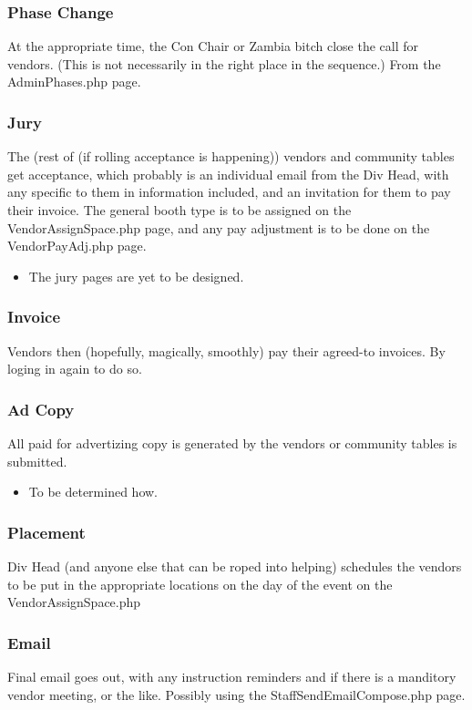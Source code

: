 \documentclass[captions=tablesignature]{scrartcl}
\begin{document}
\subsubsection{Phase Change}
\label{sec-3-2-14}
At the appropriate time, the Con Chair or Zambia bitch close the
call for vendors. (This is not necessarily in the right place in
the sequence.)  From the AdminPhases.php page.

\subsubsection{Jury}
\label{sec-3-2-15}
The (rest of (if rolling acceptance is happening)) vendors and
community tables get acceptance, which probably is an individual
email from the Div Head, with any specific to them in information
included, and an invitation for them to pay their invoice.  The
general booth type is to be assigned on the VendorAssignSpace.php
page, and any pay adjustment is to be done on the VendorPayAdj.php
page.
\begin{itemize}
\item The jury pages are yet to be designed.
\end{itemize}

\subsubsection{Invoice}
\label{sec-3-2-16}
Vendors then (hopefully, magically, smoothly) pay their agreed-to
invoices.  By loging in again to do so.

\subsubsection{Ad Copy}
\label{sec-3-2-17}
All paid for advertizing copy is generated by the vendors or
community tables is submitted.
\begin{itemize}
\item To be determined how.
\end{itemize}

\subsubsection{Placement}
\label{sec-3-2-18}
Div Head (and anyone else that can be roped into helping)
schedules the vendors to be put in the appropriate locations on
the day of the event on the VendorAssignSpace.php

\subsubsection{Email}
\label{sec-3-2-19}
Final email goes out, with any instruction reminders and if there
is a manditory vendor meeting, or the like. Possibly using the
StaffSendEmailCompose.php page.
\end{document}
